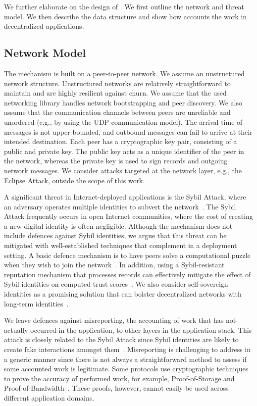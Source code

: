 We further elaborate on the design of \TrustChain{}.
We first outline the network and threat model.
We then describe the \TrustChain{} data structure and show how \TrustChain{} accounts the work in decentralized applications.

\subsection{Network Model}
\label{sec:network_model}
The \TrustChain{} mechanism is built on a peer-to-peer network.
We assume an unstructured network structure.
Unstructured networks are relatively straightforward to maintain and are highly resilient against churn.
We assume that the used networking library handles network bootstrapping and peer discovery.
We also assume that the communication channels between peers are unreliable and unordered (e.g., by using the UDP communication model).
The arrival time of messages is not upper-bounded, and outbound messages can fail to arrive at their intended destination.
Each peer has a cryptographic key pair, consisting of a public and private key.
The public key acts as a unique identifier of the peer in the network, whereas the private key is used to sign records and outgoing network messages.
We consider attacks targeted at the network layer, e.g., the Eclipse Attack, outside the scope of this work.

A significant threat in Internet-deployed applications is the Sybil Attack, where an adversary operates multiple identities to subvert the network~\cite{douceur2002sybil}.
The Sybil Attack frequently occurs in open Internet communities, where the cost of creating a new digital identity is often negligible.
Although the \TrustChain{} mechanism does not include defences against Sybil identities, we argue that this threat can be mitigated with well-established techniques that complement \TrustChain{} in a deployment setting.
A basic defence mechanism is to have peers solve a computational puzzle when they wish to join the network~\cite{li2012sybilcontrol}.
In addition, using a Sybil-resistant reputation mechanism that processes \TrustChain{} records can effectively mitigate the effect of Sybil identities on computed trust scores~\cite{delaviz2012sybilres,yu2008sybillimit}.
We also consider self-sovereign identities as a promising solution that can bolster decentralized networks with long-term identities~\cite{stokkink2018deployment}.

We leave defences against misreporting, the accounting of work that has not actually occurred in the application, to other layers in the application stack.
This attack is closely related to the Sybil Attack since Sybil identities are likely to create fake interactions amongst them~\cite{stannat2021sybil}.
Misreporting is challenging to address in a generic manner since there is not always a straightforward method to assess if some accounted work is legitimate.
Some protocols use cryptographic techniques to prove the accuracy of performed work, for example, Proof-of-Storage and Proof-of-Bandwidth~\cite{benet2018filecoin,ghosh2014torpath}.
These proofs, however, cannot easily be used across different application domains.

